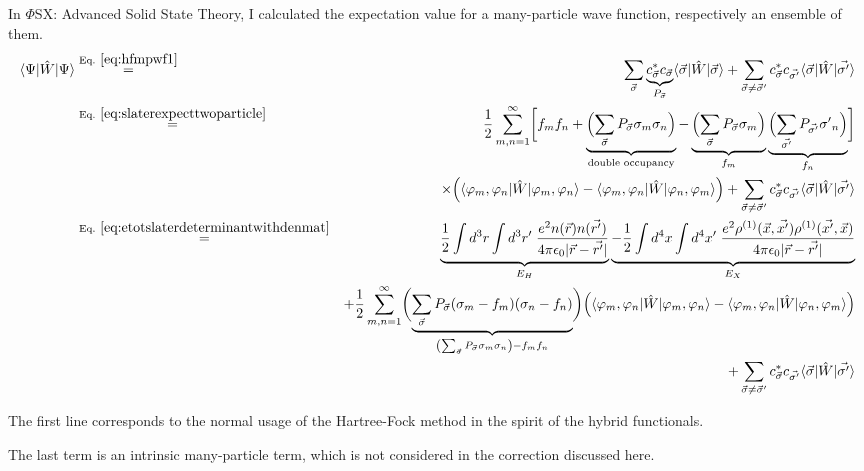 \documentclass[11pt,a4paper]{report}
\begin{document}
In $\Phi$SX: Advanced Solid State Theory, I calculated the expectation
value for a many-particle wave function, respectively an ensemble of
them.
\begin{eqnarray}
\langle\Psi|\hat{W}|\Psi\rangle
&\eqrel{eq:hfmpwf1}{=}&
\sum_{\vec{\sigma}}
\underbrace{
c^*_{\vec{\sigma}}c_{\vec{\sigma}}}_{P_{\vec{\sigma}}}
\langle\vec{\sigma}|\hat{W}|\vec{\sigma}\rangle 
+ \sum_{\vec{\sigma}\neq\vec\sigma'}c^*_{\vec{\sigma}}c_{\vec{\sigma'}}
\langle\vec{\sigma}|\hat{W}|\vec{\sigma'}\rangle 
\nonumber\\
%
%
&\eqrel{eq:slaterexpecttwoparticle}{=}&
\frac{1}{2}\sum_{m,n=1}^\infty
\biggl[f_mf_n+
\underbrace{
\Bigl(\sum_{\vec{\sigma}} P_{\vec{\sigma}} \sigma_{m}\sigma_n\Bigr)
}_{\text{double occupancy}}
-
\underbrace{
\Bigl(\sum_{\vec{\sigma}} P_{\vec{\sigma}} \sigma_{m}\Bigr)
}_{f_m}
\underbrace{
\Bigl(\sum_{\vec{\sigma'}} P_{\vec{\sigma'}} {\sigma'}_{n}\Bigr)
}_{f_n}
\biggr]
\nonumber\\
&&\times\Bigl(\langle\varphi_m,\varphi_n|\hat{W}|\varphi_m,\varphi_n\rangle 
-\langle\varphi_m,\varphi_n|\hat{W}|\varphi_n,\varphi_m\rangle 
\Bigr)
+ \sum_{\vec{\sigma}\neq\vec\sigma'}c^*_{\vec{\sigma}}c_{\vec{\sigma'}}
\langle\vec{\sigma}|\hat{W}|\vec{\sigma'}\rangle 
\nonumber\\
%
%
&\eqrel{eq:etotslaterdeterminantwithdenmat}{=}&
\underbrace{
\frac{1}{2}
\int d^3r\int d^3r'\;\frac{e^2n(\vec{r})n(\vec{r'})}
{4\pi\epsilon_0|\vec{r}-\vec{r'}|}
}_{E_H}
\underbrace{-
\frac{1}{2}
\int d^4x\int d^4x'\;\frac{e^2\rho^{(1)}(\vec{x},\vec{x'})\rho^{(1)}(\vec{x'},\vec{x})}{4\pi\epsilon_0|\vec{r}-\vec{r'}|}
}_{E_X}
\nonumber\\
&&+
\frac{1}{2}\sum_{m,n=1}^\infty
\biggl(\underbrace{
\sum_{\vec{\sigma}} P_{\vec{\sigma}}(\sigma_m-f_m)(\sigma_n-f_n)
}_{\left(\sum_{\vec{\sigma}} P_{\vec{\sigma}} \sigma_{m}\sigma_n\right)-f_mf_n}
\biggr)
\Bigl(\langle\varphi_m,\varphi_n|\hat{W}|\varphi_m,\varphi_n\rangle 
-\langle\varphi_m,\varphi_n|\hat{W}|\varphi_n,\varphi_m\rangle 
\Bigr)
\nonumber\\
&&+ \sum_{\vec{\sigma}\neq\vec\sigma'}c^*_{\vec{\sigma}}c_{\vec{\sigma'}}
\langle\vec{\sigma}|\hat{W}|\vec{\sigma'}\rangle 
\label{eq:byondmfinteraction}
\end{eqnarray}

The first line corresponds to the normal usage of the Hartree-Fock
method in the spirit of the hybrid functionals.

The last term is an intrinsic many-particle term, which is not
considered in the correction discussed here.
\end{document}
